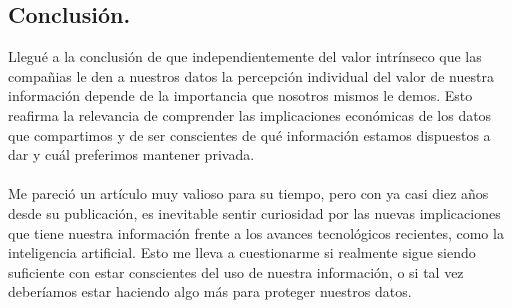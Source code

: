 \subsection*{Conclusión.}
Llegué a la conclusión de que independientemente del valor intrínseco que las compañias le den a nuestros datos la percepción individual del valor de nuestra información depende de la importancia que nosotros mismos le demos. Esto reafirma la relevancia de comprender las implicaciones económicas de los datos que compartimos y de ser conscientes de qué información estamos dispuestos a dar y cuál preferimos mantener privada.\\ \\
Me pareció un artículo muy valioso para su tiempo, pero con ya casi diez años desde su publicación, es inevitable sentir curiosidad por las nuevas implicaciones que tiene nuestra información frente a los avances tecnológicos recientes, como la inteligencia artificial. Esto me lleva a cuestionarme si realmente sigue siendo suficiente con estar conscientes del uso de nuestra información, o si tal vez deberíamos estar haciendo algo más para proteger nuestros datos.
